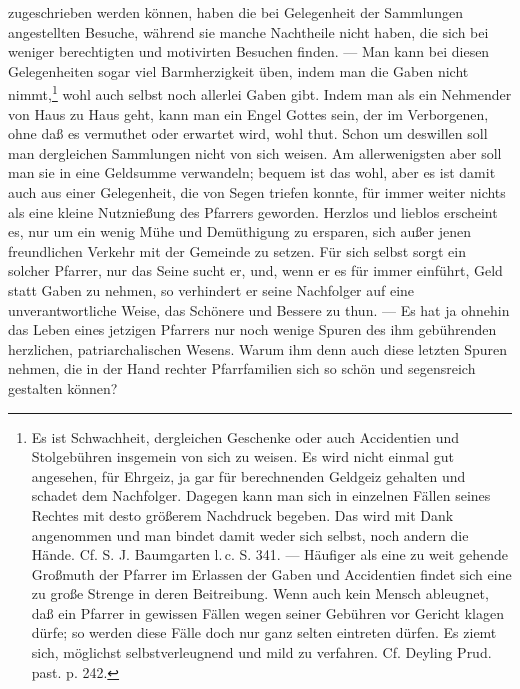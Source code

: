 zugeschrieben werden können, haben die bei Gelegenheit der Sammlungen angestellten Besuche, während sie manche Nachtheile nicht haben, die sich bei weniger berechtigten und motivirten Besuchen finden. — Man kann bei diesen Gelegenheiten sogar viel Barmherzigkeit üben, indem man die Gaben nicht nimmt,\footnote{Es ist Schwachheit, dergleichen Geschenke oder auch Accidentien und Stolgebühren insgemein von sich zu weisen. Es wird nicht einmal gut angesehen, für Ehrgeiz, ja gar für berechnenden Geldgeiz gehalten und schadet dem Nachfolger. Dagegen kann man sich in einzelnen Fällen seines Rechtes mit desto größerem Nachdruck begeben. Das wird mit Dank angenommen und man bindet damit weder sich selbst, noch andern die Hände. Cf. S. J. Baumgarten l.\,c. S. 341. — Häufiger als eine zu weit gehende Großmuth der Pfarrer im Erlassen der Gaben und Accidentien findet sich eine zu große Strenge in deren Beitreibung. Wenn auch kein Mensch ableugnet, daß ein Pfarrer in gewissen Fällen wegen seiner Gebühren vor Gericht klagen dürfe; so werden diese Fälle doch nur ganz selten eintreten dürfen. Es ziemt sich, möglichst selbstverleugnend und mild zu verfahren. Cf. Deyling Prud. past. p. 242.} wohl auch selbst noch allerlei Gaben gibt. Indem man als ein Nehmender von Haus zu Haus geht, kann man ein Engel Gottes sein, der im Verborgenen, ohne daß es vermuthet oder erwartet wird, wohl thut. Schon um deswillen soll man dergleichen Sammlungen nicht von sich weisen. Am allerwenigsten aber soll man sie in eine Geldsumme verwandeln; bequem ist das wohl, aber es ist damit auch aus einer Gelegenheit, die von Segen triefen konnte, für immer weiter nichts als eine kleine Nutznießung des Pfarrers geworden. Herzlos und lieblos erscheint es, nur um ein wenig Mühe und Demüthigung zu ersparen,
sich außer jenen freundlichen Verkehr mit der Gemeinde zu setzen. Für sich selbst sorgt ein solcher Pfarrer, nur das Seine sucht er, und, wenn er es für immer einführt, Geld statt Gaben zu nehmen, so verhindert er seine Nachfolger auf eine unverantwortliche Weise, das Schönere und Bessere zu thun. — Es hat ja ohnehin das Leben eines jetzigen Pfarrers nur noch wenige Spuren des ihm gebührenden herzlichen, patriarchalischen Wesens. Warum ihm denn auch diese letzten Spuren nehmen, die in der Hand rechter Pfarrfamilien sich so schön und segensreich gestalten können?

